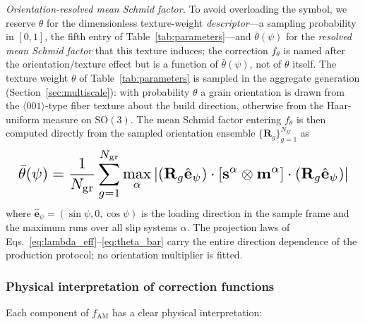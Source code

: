 \documentclass[twocolumn]{sagej}
\begin{document}
\emph{Orientation-resolved mean Schmid factor.} To avoid overloading the symbol, we reserve $\theta$ for the dimensionless texture-weight \emph{descriptor}---a sampling probability in $[0,1]$, the fifth entry of Table~\ref{tab:parameters}---and $\bar{\theta}(\psi)$ for the \emph{resolved mean Schmid factor} that this texture induces; the correction $f_\theta$ is named after the orientation/texture effect but is a function of $\bar{\theta}(\psi)$, not of $\theta$ itself. The texture weight $\theta$ of Table~\ref{tab:parameters} is sampled in the aggregate generation (Section~\ref{sec:multiscale}): with probability $\theta$ a grain orientation is drawn from the $\langle001\rangle$-type fiber texture about the build direction, otherwise from the Haar-uniform measure on $\mathrm{SO}(3)$. The mean Schmid factor entering $f_\theta$ is then computed directly from the sampled orientation ensemble $\{\mathbf{R}_g\}_{g=1}^{N_{\mathrm{gr}}}$ as
\begin{equation}
\resizebox{0.97\columnwidth}{!}{$\displaystyle \bar{\theta}(\psi) = \frac{1}{N_{\mathrm{gr}}} \sum_{g=1}^{N_{\mathrm{gr}}} \max_{\alpha} \left| \left(\mathbf{R}_g \hat{\mathbf{e}}_\psi\right) \cdot \left[ \mathbf{s}^\alpha \otimes \mathbf{m}^\alpha \right] \cdot \left(\mathbf{R}_g \hat{\mathbf{e}}_\psi\right) \right|$}
\label{eq:theta_bar}
\end{equation}
where $\hat{\mathbf{e}}_\psi = (\sin\psi, 0, \cos\psi)$ is the loading direction in the sample frame and the maximum runs over all slip systems $\alpha$. The projection laws of Eqs.~\eqref{eq:lambda_eff}--\eqref{eq:theta_bar} carry the entire direction dependence of the production protocol; no orientation multiplier is fitted.

\subsubsection{Physical interpretation of correction functions}

Each component of $f_{\text{AM}}$ has a clear physical interpretation:
\end{document}
